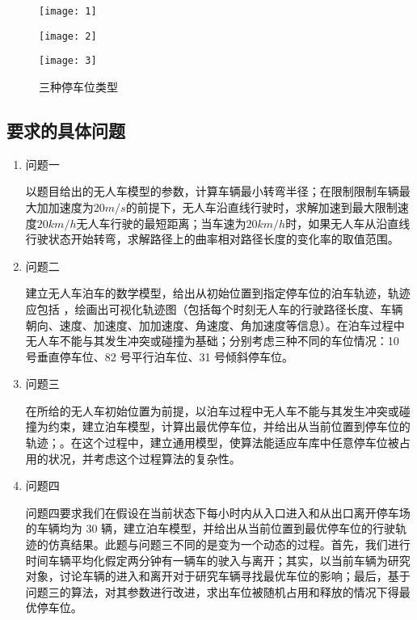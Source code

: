 \documentclass{MathorCupmodeling}
\begin{document}
	\begin{figure}[h]
		\centering
		\begin{minipage}[c]{0.3\textwidth}
			\centering
			\texttt{[image: 1]}
			\label{fig:sample-figure-a}
		\end{minipage}
		\begin{minipage}[c]{0.3\textwidth}
			\centering
			\texttt{[image: 2]}
			\label{fig:sample-figure-b}
		\end{minipage}
		\begin{minipage}[c]{0.3\textwidth}
			\centering
			\texttt{[image: 3]}
			\label{fig:sample-figure-c}
		\end{minipage}
		\caption{三种停车位类型}
		\label{fig:sample-figure}
	\end{figure}
	\subsection{要求的具体问题}
	
	\begin{enumerate}
		\item 问题一
		
		以题目给出的无人车模型的参数，计算车辆最小转弯半径；在限制限制车辆最大加加速度为$20 m/s$的前提下，无人车沿直线行驶时，求解加速到最大限制速度$20km/h$无人车行驶的最短距离；当车速为$20km/h$时，如果无人车从沿直线行驶状态开始转弯，求解路径上的曲率相对路径长度的变化率的取值范围。
		\item 问题二
		
		建立无人车泊车的数学模型，给出从初始位置到指定停车位的泊车轨迹，轨迹应包括  ，绘画出可视化轨迹图（包括每个时刻无人车的行驶路径长度、车辆朝向、速度、加速度、加加速度、角速度、角加速度等信息）。在泊车过程中无人车不能与其发生冲突或碰撞为基础；分别考虑三种不同的车位情况：10 号垂直停车位、82 号平行泊车位、31 号倾斜停车位。
		\item 问题三
		
		在所给的无人车初始位置为前提，以泊车过程中无人车不能与其发生冲突或碰撞为约束，建立泊车模型，计算出最优停车位，并给出从当前位置到停车位的轨迹；。在这个过程中，建立通用模型，使算法能适应车库中任意停车位被占用的状况，并考虑这个过程算法的复杂性。
		\item 问题四
		
		问题四要求我们在假设在当前状态下每小时内从入口进入和从出口离开停车场的车辆均为 30 辆，建立泊车模型，并给出从当前位置到最优停车位的行驶轨迹的仿真结果。此题与问题三不同的是变为一个动态的过程。首先，我们进行时间车辆平均化假定两分钟有一辆车的驶入与离开；其实，以当前车辆为研究对象，讨论车辆的进入和离开对于研究车辆寻找最优车位的影响；最后，基于问题三的算法，对其参数进行改进，求出车位被随机占用和释放的情况下得最优停车位。
	\end{enumerate}
\end{document}
